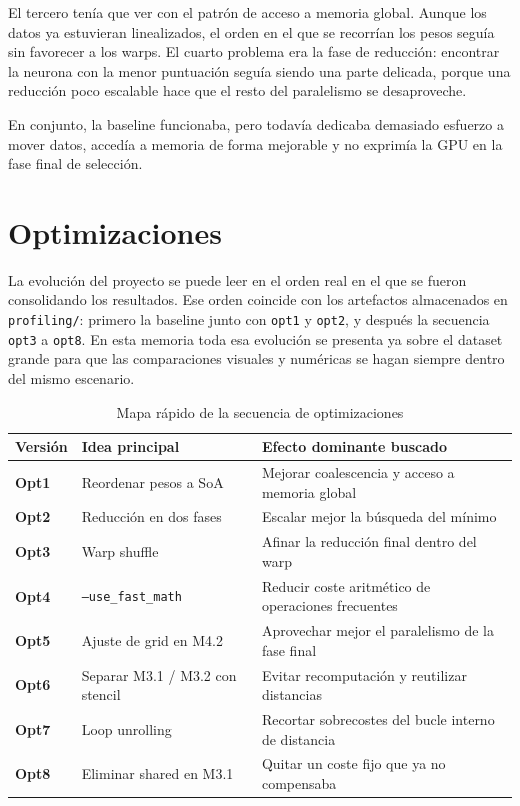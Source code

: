 \documentclass[11pt,a4paper]{article}
\begin{document}
El tercero tenía que ver con el patrón de acceso a memoria global. Aunque los datos ya estuvieran linealizados, el orden en el que se recorrían los pesos seguía sin favorecer a los warps. El cuarto problema era la fase de reducción: encontrar la neurona con la menor puntuación seguía siendo una parte delicada, porque una reducción poco escalable hace que el resto del paralelismo se desaproveche.

En conjunto, la baseline funcionaba, pero todavía dedicaba demasiado esfuerzo a mover datos, accedía a memoria de forma mejorable y no exprimía la GPU en la fase final de selección.

\section{Optimizaciones}

La evolución del proyecto se puede leer en el orden real en el que se fueron consolidando los resultados. Ese orden coincide con los artefactos almacenados en \texttt{profiling/}: primero la baseline junto con \texttt{opt1} y \texttt{opt2}, y después la secuencia \texttt{opt3} a \texttt{opt8}. En esta memoria toda esa evolución se presenta ya sobre el dataset grande para que las comparaciones visuales y numéricas se hagan siempre dentro del mismo escenario.

\begin{table}[H]
\centering
\caption{Mapa rápido de la secuencia de optimizaciones}
\label{tab:ruta-opt}
\begin{tabularx}{\textwidth}{>{\bfseries}l L L}
\toprule
Versión & Idea principal & Efecto dominante buscado \\
\midrule
Opt1 & Reordenar pesos a SoA & Mejorar coalescencia y acceso a memoria global \\
Opt2 & Reducción en dos fases & Escalar mejor la búsqueda del mínimo \\
Opt3 & Warp shuffle & Afinar la reducción final dentro del warp \\
Opt4 & \texttt{--use\_fast\_math} & Reducir coste aritmético de operaciones frecuentes \\
Opt5 & Ajuste de grid en M4.2 & Aprovechar mejor el paralelismo de la fase final \\
Opt6 & Separar M3.1 / M3.2 con stencil & Evitar recomputación y reutilizar distancias \\
Opt7 & Loop unrolling & Recortar sobrecostes del bucle interno de distancia \\
Opt8 & Eliminar shared en M3.1 & Quitar un coste fijo que ya no compensaba \\
\bottomrule
\end{tabularx}
\end{table}
\end{document}
